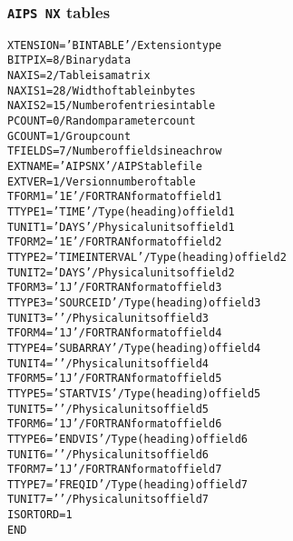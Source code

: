 \documentclass[twoside]{article}
\begin{document}
\subsubsection{{\tt AIPS NX} tables}
\label{Appe:NXtable}
\begin{alltt}
XTENSION= 'BINTABLE'           / Extension type
BITPIX  =                    8 / Binary data
NAXIS   =                    2 / Table is a matrix
NAXIS1  =                   28 / Width of table in bytes
NAXIS2  =                   15 / Number of entries in table
PCOUNT  =                    0 / Random parameter count
GCOUNT  =                    1 / Group count
TFIELDS =                    7 / Number of fields in each row
EXTNAME = 'AIPS NX '           / AIPS table file
EXTVER  =                    1 / Version number of table
TFORM1  = '1E      '           / FORTRAN format of field  1
TTYPE1  = 'TIME            '   / Type (heading) of field  1
TUNIT1  = 'DAYS    '           / Physical units of field  1
TFORM2  = '1E      '           / FORTRAN format of field  2
TTYPE2  = 'TIME INTERVAL   '   / Type (heading) of field  2
TUNIT2  = 'DAYS    '           / Physical units of field  2
TFORM3  = '1J      '           / FORTRAN format of field  3
TTYPE3  = 'SOURCE ID       '   / Type (heading) of field  3
TUNIT3  = '        '           / Physical units of field  3
TFORM4  = '1J      '           / FORTRAN format of field  4
TTYPE4  = 'SUBARRAY        '   / Type (heading) of field  4
TUNIT4  = '        '           / Physical units of field  4
TFORM5  = '1J      '           / FORTRAN format of field  5
TTYPE5  = 'START VIS       '   / Type (heading) of field  5
TUNIT5  = '        '           / Physical units of field  5
TFORM6  = '1J      '           / FORTRAN format of field  6
TTYPE6  = 'END VIS         '   / Type (heading) of field  6
TUNIT6  = '        '           / Physical units of field  6
TFORM7  = '1J      '           / FORTRAN format of field  7
TTYPE7  = 'FREQ ID         '   / Type (heading) of field  7
TUNIT7  = '        '           / Physical units of field  7
ISORTORD=                   1
END
\end{alltt}
\end{document}
